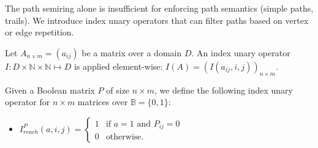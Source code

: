 The path semiring alone is insufficient for enforcing path semantics (simple paths, trails). We introduce index unary operators that can filter paths based on vertex or edge repetition.

\begin{definition}
	Let $A_{n \times m} = (a_{ij})$ be a matrix over a domain $D$. An index unary operator $I: D \times \mathbb{N} \times \mathbb{N} \mapsto D$ is applied element-wise: $I(A) = (I(a_{ij}, i, j))_{n \times m}$.
\end{definition}

Given a Boolean matrix $P$ of size $n \times m$, we define the following index unary operator for $n \times m$ matrices over $\mathbb{B} = \{ 0, 1 \}$:

\begin{itemize}
  \item $I^P_{reach}(a, i, j) = \begin{cases}
      1 & \text{if } a = 1 \text{ and } P_{ij} = 0\\
      0 & \text{otherwise}.
    \end{cases}$
\end{itemize}


